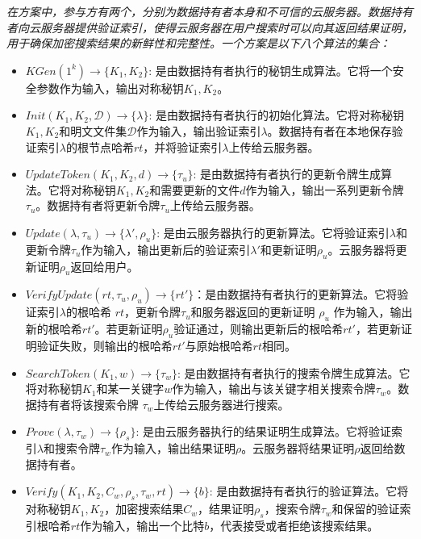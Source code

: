 \begin{definition}\label{def:single}
  {\itshape
      在\single 方案中，参与方有两个，分别为数据持有者本身和不可信的云服务器。数据持有者向云服务器提供验证索引，使得云服务器在用户搜索时可以向其返回结果证明，用于确保加密搜索结果的新鲜性和完整性。一个\single 方案是以下八个算法的集合：
      \begin{itemize}
        \item $KGen(1^k) \rightarrow \{K_1,K_2\}$: 是由数据持有者执行的秘钥生成算法。它将一个安全参数作为输入，输出对称秘钥$K_1,K_2$。
        \item $Init(K_1,K_2, \mathcal{D}) \rightarrow \{\lambda\}$: 是由数据持有者执行的初始化算法。它将对称秘钥$K_1,K_2$和明文文件集$\mathcal{D}$作为输入，输出验证索引$\lambda$。数据持有者在本地保存验证索引$\lambda$的根节点哈希$rt$，并将验证索引$\lambda$上传给云服务器。
        \item $UpdateToken(K_1,K_2, d) \rightarrow \{\tau_u\}$: 是由数据持有者执行的更新令牌生成算法。它将对称秘钥$K_1,K_2$和需要更新的文件$d$作为输入，输出一系列更新令牌$\tau_u$。数据持有者将更新令牌$\tau_u$上传给云服务器。
        \item $Update(\lambda, \tau_u) \rightarrow \{\lambda',\rho_u\}$: 是由云服务器执行的更新算法。它将验证索引$\lambda$和更新令牌$\tau_u$作为输入，输出更新后的验证索引$\lambda'$和更新证明$\rho_u$。云服务器将更新证明$\rho_u$返回给用户。
        \item $VerifyUpdate(rt,\tau_u,\rho_u) \rightarrow \{rt'\}$：是由数据持有者执行的更新算法。它将验证索引$\lambda$的根哈希 $rt$，更新令牌$\tau_u$和服务器返回的更新证明 $\rho_u$ 作为输入，输出新的根哈希$rt'$。若更新证明$\rho_u$验证通过，则输出更新后的根哈希$rt'$，若更新证明验证失败，则输出的根哈希$rt'$与原始根哈希$rt$相同。
        \item $SearchToken(K_1, w) \rightarrow \{\tau_{w}\}$: 是由数据持有者执行的搜索令牌生成算法。它将对称秘钥$K_1$和某一关键字$w$作为输入，输出与该关键字相关搜索令牌$\tau_{w}$。数据持有者将该搜索令牌 $\tau_{w}$上传给云服务器进行搜索。
        \item $Prove(\lambda, \tau_{w}) \rightarrow \{\rho_s\}$: 是由云服务器执行的结果证明生成算法。它将验证索引$\lambda$和搜索令牌$\tau_{w}$作为输入，输出结果证明$\rho$。云服务器将结果证明$\rho$返回给数据持有者。
        \item $Verify(K_1,K_2, C_w, \rho_s,\tau_{w}, rt) \rightarrow \{b\}$: 是由数据持有者执行的验证算法。它将对称秘钥$K_1,K_2$，加密搜索结果$C_w$，结果证明$\rho_s$，搜索令牌$\tau_{w}$和保留的验证索引根哈希$rt$作为输入，输出一个比特$b$，代表接受或者拒绝该搜索结果。
      \end{itemize}
      }
\end{definition}

